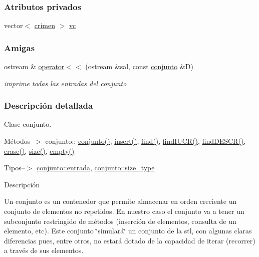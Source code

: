 \subsubsection*{Atributos privados}
\begin{DoxyCompactItemize}
\item 
vector$<$ \hyperlink{classcrimen}{crimen} $>$ \hyperlink{classconjunto_aed485e92bb3d8b2c82fc85657947761d}{vc}
\end{DoxyCompactItemize}
\subsubsection*{Amigas}
\begin{DoxyCompactItemize}
\item 
ostream \& \hyperlink{classconjunto_ae54b721035471d372f29c0335c42734a}{operator$<$$<$} (ostream \&sal, const \hyperlink{classconjunto}{conjunto} \&D)
\begin{DoxyCompactList}\small\item\em imprime todas las entradas del conjunto \end{DoxyCompactList}\end{DoxyCompactItemize}


\subsubsection{Descripción detallada}
Clase conjunto. 

Métodos--$>$ conjunto\-:\-: \hyperlink{classconjunto_a16d987f42c679efab01748178ba45891}{conjunto()}, \hyperlink{classconjunto_aa65b9f7c4cb9bad6d4e40c1973095930}{insert()}, \hyperlink{classconjunto_a64ee1c67331bce15dc029048631dda97}{find()}, \hyperlink{classconjunto_a50eb93f152dc973726d184733d7ecd98}{find\-I\-U\-C\-R()}, \hyperlink{classconjunto_a5190c59db573008cc48a8ce734954a96}{find\-D\-E\-S\-C\-R()}, \hyperlink{classconjunto_ad550177fa4454da3a10fa356417e39a7}{erase()}, \hyperlink{classconjunto_a863e1e106e35adda47e7c5e2067295b9}{size()}, \hyperlink{classconjunto_afcf4ff3ff3c1f83b63e901efebe93533}{empty()}

Tipos--$>$ \hyperlink{classconjunto_a09cad766dd65de73e51eae21f9d22585}{conjunto\-::entrada}, \hyperlink{classconjunto_a855a5893bb0f5a851ab2dbf2b8aa6cc7}{conjunto\-::size\-\_\-type}

Descripción

Un conjunto es un contenedor que permite almacenar en orden creciente un conjunto de elementos no repetidos. En nuestro caso el conjunto va a tener un subconjunto restringido de métodos (inserción de elementos, consulta de un elemento, etc). Este conjunto \char`\"{}simulará\char`\"{} un conjunto de la stl, con algunas claras diferencias pues, entre otros, no estará dotado de la capacidad de iterar (recorrer) a través de sus elementos.


